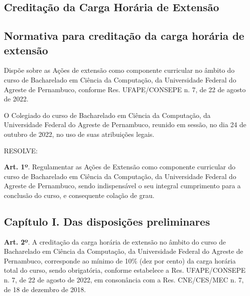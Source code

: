 \documentclass[
	12pt,				%
	openright,			%
  oneside,     %
	a4paper,			%
	english,			%
	french,				%
	spanish,			%
	brazil				%
	]{abntex2}
\begin{document}
\begin{anexosenv}


\chapter*{Creditação da Carga Horária de Extensão}
\label{anexo:creditacao_extensao}

\section*{Normativa para creditação da carga horária de extensão}

\hfill\begin{minipage}[t]{6cm}
  Dispõe sobre as Ações de extensão como componente curricular no âmbito do curso de Bacharelado em Ciência da Computação, da Universidade Federal do Agreste de Pernambuco, conforme Res. UFAPE/CONSEPE n. 7, de 22 de agosto de 2022.
\end{minipage}

\vspace{12pt}

O Colegiado do curso de Bacharelado em Ciência da Computação, da Universidade Federal do Agreste de Pernambuco, reunido em sessão, no dia 24 de outubro de 2022, no uso de suas atribuições legais.

\vspace{12pt}

\noindent RESOLVE:

\vspace{12pt}

\noindent \textbf{Art. 1º}. Regulamentar as Ações de Extensão como componente curricular do curso de Bacharelado em Ciência da Computação, da Universidade Federal do Agreste de Pernambuco, sendo indispensável o seu integral cumprimento para a conclusão do curso, e consequente colação de grau.

\section*{Capítulo I. Das disposições preliminares}

\noindent \textbf{Art. 2º}. A creditação da carga horária de extensão no âmbito do curso de Bacharelado em Ciência da Computação, da Universidade Federal do Agreste de Pernambuco, corresponde ao mínimo de 10\% (dez por cento) da carga horária total do curso, sendo obrigatória, conforme estabelece a Res. UFAPE/CONSEPE n. 7, de 22 de agosto de 2022, em consonância com a Res. CNE/CES/MEC n. 7, de 18 de dezembro de 2018.


\end{anexosenv}
\end{document}
